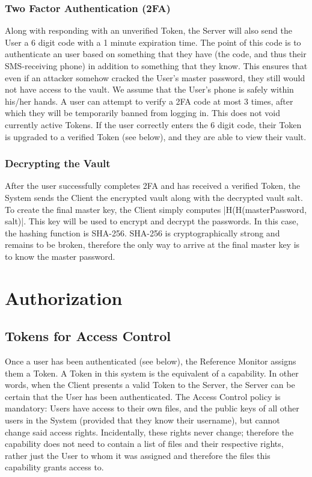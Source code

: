 \documentclass{article}
\begin{document}
\subsubsection{Two Factor Authentication (2FA)}
\par Along with responding with an unverified Token, the Server will also send the User a 6 digit code with a 1 minute expiration time. The point of this code is to authenticate an user based on something that they have (the code, and thus their SMS-receiving phone) in addition to something that they know. This ensures that even if an attacker somehow cracked the User's master password, they still would not have access to the vault. We assume that the User's phone is safely within his/her hands. A user can attempt to verify a 2FA code at most 3 times, after which they will be temporarily banned from logging in. This does not void currently active Tokens. If the user correctly enters the 6 digit code, their Token is upgraded to a verified Token (see below), and they are able to view their vault.

\subsubsection{Decrypting the Vault}
After the user successfully completes 2FA and has received a verified Token, the System sends the Client the encrypted vault along with the decrypted vault salt. To create the final master key, the Client simply computes |H(H(masterPassword, salt)|. This key will be used to encrypt and decrypt the passwords. In this case, the hashing function is SHA-256. SHA-256 is cryptographically strong and remains to be broken, therefore the only way to arrive at the final master key is to know the master password.

\section{Authorization}

\subsection{Tokens for Access Control}
\label{sub:tokens}
\par Once a user has been authenticated (see below), the Reference Monitor assigns them a Token. A Token in this system is the equivalent of a capability. In other words, when the Client presents a valid Token to the Server, the Server can be certain that the User has been authenticated. The Access Control policy is mandatory: Users have access to their own files, and the public keys of all other users in the System (provided that they know their username), but cannot change said access rights. Incidentally, these rights never change; therefore the capability does not need to contain a list of files and their respective rights, rather just the User to whom it was assigned and therefore the files this capability grants access to.
\end{document}
